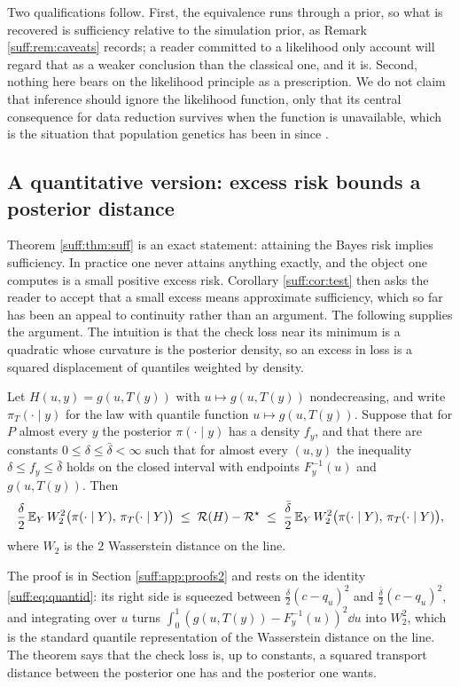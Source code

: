Two qualifications follow. First, the equivalence runs through a prior, so what is recovered
is sufficiency relative to the simulation prior, as Remark \ref{suff:rem:caveats} records; a
reader committed to a likelihood only account will regard that as a weaker conclusion than the
classical one, and it is. Second, nothing here bears on the likelihood principle as a
prescription. We do not claim that inference should ignore the likelihood function, only that
its central consequence for data reduction survives when the function is unavailable, which is
the situation that population genetics has been in since \citet{suff:tavare1997}.

\subsection{A quantitative version: excess risk bounds a posterior distance}
\label{suff:sec:quant}

Theorem \ref{suff:thm:suff} is an exact statement: attaining the Bayes risk implies
sufficiency. In practice one never attains anything exactly, and the object one computes is a
small positive excess risk. Corollary \ref{suff:cor:test} then asks the reader to accept that a
small excess means approximate sufficiency, which so far has been an appeal to continuity
rather than an argument. The following supplies the argument. The intuition is that the check
loss near its minimum is a quadratic whose curvature is the posterior density, so an excess
in loss is a squared displacement of quantiles weighted by density.

\begin{theorem}
\label{suff:thm:quant}
Let $H(u,y)=g(u,T(y))$ with $u\mapsto g(u,T(y))$ nondecreasing, and write
$\pi_T(\cdot\mid y)$ for the law with quantile function $u\mapsto g(u,T(y))$. Suppose that for
$P$ almost every $y$ the posterior $\pi(\cdot\mid y)$ has a density $f_y$, and that there are
constants $0\le\delta\le \bar\delta<\infty$ such that for almost every $(u,y)$ the inequality
$\delta\le f_y\le \bar\delta$ holds on the closed interval with endpoints $F_y^{-1}(u)$ and
$g(u,T(y))$. Then
\[
\frac{\delta}{2}\,\mathbb{E}_Y\,W_2^2\big(\pi(\cdot\mid Y),\,\pi_T(\cdot\mid Y)\big)
\;\le\;
\mathcal{R}(H)-\mathcal{R}^\star
\;\le\;
\frac{\bar\delta}{2}\,\mathbb{E}_Y\,W_2^2\big(\pi(\cdot\mid Y),\,\pi_T(\cdot\mid Y)\big),
\]
where $W_2$ is the $2$ Wasserstein distance on the line.
\end{theorem}

The proof is in Section \ref{suff:app:proofs2} and rests on the identity
\eqref{suff:eq:quantid}: its right side is squeezed between $\tfrac{\delta}{2}(c-q_u)^2$ and
$\tfrac{\bar\delta}{2}(c-q_u)^2$, and integrating over $u$ turns
$\int_0^1(g(u,T(y))-F_y^{-1}(u))^2\dd u$ into $W_2^2$, which is the standard quantile
representation of the Wasserstein distance on the line. The theorem says that the check loss
is, up to constants, a squared transport distance between the posterior one has and the
posterior one wants.

